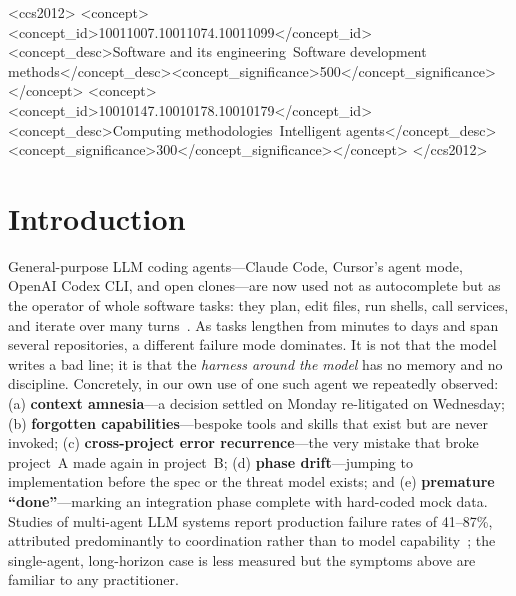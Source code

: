 \documentclass[sigconf,review,anonymous=false]{acmart}
\begin{document}
\begin{CCSXML}
<ccs2012>
<concept><concept_id>10011007.10011074.10011099</concept_id><concept_desc>Software and its engineering~Software development methods</concept_desc><concept_significance>500</concept_significance></concept>
<concept><concept_id>10010147.10010178.10010179</concept_id><concept_desc>Computing methodologies~Intelligent agents</concept_desc><concept_significance>300</concept_significance></concept>
</ccs2012>
\end{CCSXML}


\maketitle

\section{Introduction}
General-purpose LLM coding agents---Claude Code, Cursor's agent mode, OpenAI
Codex CLI, and open clones---are now used not as autocomplete but as the operator
of whole software tasks: they plan, edit files, run shells, call services, and
iterate over many turns~\cite{liu2026divecc}. As tasks lengthen from minutes to
days and span several repositories, a different failure mode dominates. It is not
that the model writes a bad line; it is that the \emph{harness around the model}
has no memory and no discipline. Concretely, in our own use of one such agent we
repeatedly observed: (a) \textbf{context amnesia}---a decision settled on Monday
re-litigated on Wednesday; (b) \textbf{forgotten capabilities}---bespoke tools and
skills that exist but are never invoked; (c) \textbf{cross-project error
recurrence}---the very mistake that broke project~A made again in project~B; (d)
\textbf{phase drift}---jumping to implementation before the spec or the threat
model exists; and (e) \textbf{premature ``done''}---marking an integration phase
complete with hard-coded mock data. Studies of multi-agent LLM systems report
production failure rates of 41--87\%, attributed predominantly to coordination
rather than to model capability~\cite{nechepurenko2026coord}; the single-agent,
long-horizon case is less measured but the symptoms above are familiar to any
practitioner.
\end{document}
